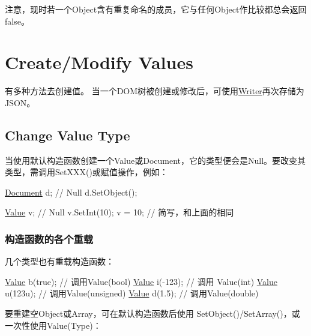 注意，现时若一个\+Object含有重复命名的成员，它与任何\+Object作比较都总会返回{\ttfamily false}。\hypertarget{md_Commun_Externe_RapidJSON_doc_tutorial.zh-cn_CreateModifyValues}{}\section{Create/\+Modify Values}\label{md_Commun_Externe_RapidJSON_doc_tutorial.zh-cn_CreateModifyValues}
有多种方法去创建值。 当一个\+D\+O\+M树被创建或修改后，可使用{\ttfamily \hyperlink{class_writer}{Writer}}再次存储为\+J\+S\+O\+N。\hypertarget{md_Commun_Externe_RapidJSON_doc_tutorial.zh-cn_ChangeValueType}{}\subsection{Change Value Type}\label{md_Commun_Externe_RapidJSON_doc_tutorial.zh-cn_ChangeValueType}
当使用默认构造函数创建一个\+Value或\+Document，它的类型便会是\+Null。要改变其类型，需调用{\ttfamily Set\+X\+X\+X()}或赋值操作，例如：


\begin{DoxyCode}
\hyperlink{class_generic_document}{Document} d; \textcolor{comment}{// Null}
d.SetObject();

\hyperlink{class_generic_value}{Value} v;    \textcolor{comment}{// Null}
v.SetInt(10);
v = 10;     \textcolor{comment}{// 简写，和上面的相同}
\end{DoxyCode}


\subsubsection*{构造函数的各个重载}

几个类型也有重载构造函数：


\begin{DoxyCode}
\hyperlink{class_generic_value}{Value} b(\textcolor{keyword}{true});    \textcolor{comment}{// 调用Value(bool)}
\hyperlink{class_generic_value}{Value} i(-123);    \textcolor{comment}{// 调用 Value(int)}
\hyperlink{class_generic_value}{Value} u(123u);    \textcolor{comment}{// 调用Value(unsigned)}
\hyperlink{class_generic_value}{Value} d(1.5);     \textcolor{comment}{// 调用Value(double)}
\end{DoxyCode}


要重建空\+Object或\+Array，可在默认构造函数后使用 {\ttfamily Set\+Object()}/{\ttfamily Set\+Array()}，或一次性使用{\ttfamily Value(\+Type)}：


